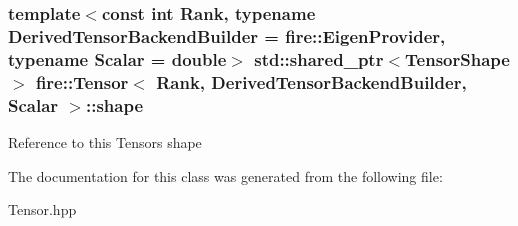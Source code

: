 \subsubsection[{\texorpdfstring{shape}{shape}}]{\setlength{\rightskip}{0pt plus 5cm}template$<$const int Rank, typename Derived\+Tensor\+Backend\+Builder = fire\+::\+Eigen\+Provider, typename Scalar = double$>$ std\+::shared\+\_\+ptr$<${\bf Tensor\+Shape}$>$ {\bf fire\+::\+Tensor}$<$ Rank, Derived\+Tensor\+Backend\+Builder, Scalar $>$\+::shape\hspace{0.3cm}{\ttfamily [protected]}}\hypertarget{a00299_ab35d7a07696ced19cb5f0cebb6406ce4}{}\label{a00299_ab35d7a07696ced19cb5f0cebb6406ce4}
Reference to this Tensors shape 

The documentation for this class was generated from the following file\+:\begin{DoxyCompactItemize}
\item 
Tensor.\+hpp\end{DoxyCompactItemize}
